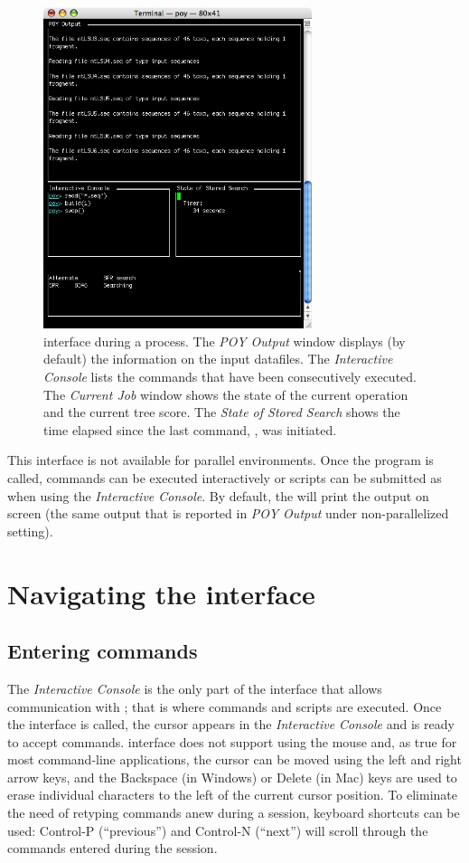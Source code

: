 \begin{figure}[htbp]
   \centering
   \includegraphics[width=0.7\textwidth]{figures/figprocess.jpg}
   \caption{\poy interface during a process. The \emph{POY Output} window displays (by default) the information on the input datafiles. The \emph{Interactive Console} lists the commands that have been consecutively executed. The \emph{Current Job} window shows the state of the current operation and the current tree score. The \emph{State of Stored Search} shows the time elapsed  since the last command, , was initiated.}
   \label{fig:figprocess}
\end{figure}

This \poy interface is not available for parallel environments. Once the program is called, \poy commands can be executed interactively or scripts can be submitted as when using the \emph{Interactive Console}. By default, the \poy will print the output on screen (the same output that is reported in \emph{POY Output} under non-parallelized setting).

\section{Navigating the interface}

\subsection{Entering commands}
The \emph{Interactive Console} is the only part of the interface that allows communication with \poy; that is where commands and scripts are executed. Once the \poy interface is called, the cursor appears in the \emph{Interactive Console} and \poy is ready to accept commands. \poy interface does not support using the mouse and, as true for most command-line applications, the cursor can be moved using the left and right arrow keys, and the Backspace (in Windows) or Delete (in Mac) keys are used to erase individual characters to the left of the current cursor position. To eliminate the need of retyping commands anew during a \poy session, keyboard shortcuts can be used: Control-P (``previous'') and Control-N (``next'') will scroll through the commands entered during the session.

